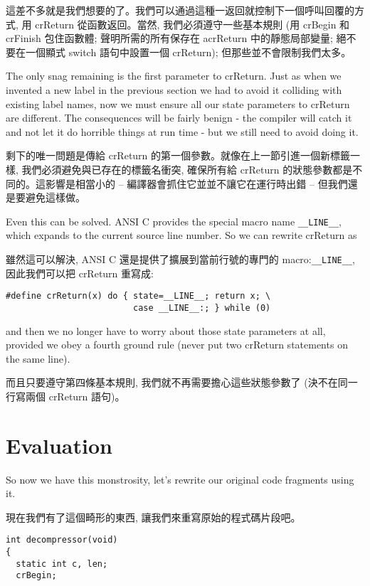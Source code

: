 \documentclass[12pt]{article}
\begin{document}
\begin{CJK}{UTF8}{bsmi}
這差不多就是我們想要的了。我們可以通過這種一返回就控制下一個呼叫回覆的方式, 用 crReturn
從函數返回。當然, 我們必須遵守一些基本規則 (用 crBegin 和 crFinish 包住函數體; 聲明所需的所有保存在
acrReturn 中的靜態局部變量; 絕不要在一個顯式 switch 語句中設置一個 crReturn); 但那些並不會限制我們太多。

The only snag remaining is the first parameter to crReturn. Just as when we invented a new label in the previous section we had to avoid it colliding with existing label names, now we must ensure all our state parameters to crReturn are different. The consequences will be fairly benign - the compiler will catch it and not let it do horrible things at run time - but we still need to avoid doing it.

剩下的唯一問題是傳給 crReturn 的第一個參數。就像在上一節引進一個新標籤一樣, 我們必須避免與已存在的標籤名衝突, 確保所有給 crReturn 的狀態參數都是不同的。這影響是相當小的 -- 編譯器會抓住它並並不讓它在運行時出錯 -- 但我們還是要避免這樣做。

Even this can be solved. ANSI C provides the special macro name \verb+__LINE__+, which expands to the current source line number. So we can rewrite crReturn as

雖然這可以解決, ANSI C 還是提供了擴展到當前行號的專門的 macro:\verb+__LINE__+, 因此我們可以把 crReturn 重寫成:

\begin{lstlisting}[basicstyle=\footnotesize, breaklines=true]
#define crReturn(x) do { state=__LINE__; return x; \
                         case __LINE__:; } while (0)
\end{lstlisting}

and then we no longer have to worry about those state parameters at all, provided we obey a fourth ground rule (never put two crReturn statements on the same line).

而且只要遵守第四條基本規則, 我們就不再需要擔心這些狀態參數了 (決不在同一行寫兩個 crReturn 語句)。 

\section{Evaluation}

So now we have this monstrosity, let's rewrite our original code fragments using it.

現在我們有了這個畸形的東西, 讓我們來重寫原始的程式碼片段吧。 

\newpage
\begin{multicols}{2}
\begin{lstlisting}[caption=decompressor, basicstyle=\footnotesize, breaklines=true]
int decompressor(void) 
{
  static int c, len;
  crBegin;


\end{lstlisting}
\end{multicols}
\end{CJK}
\end{document}
